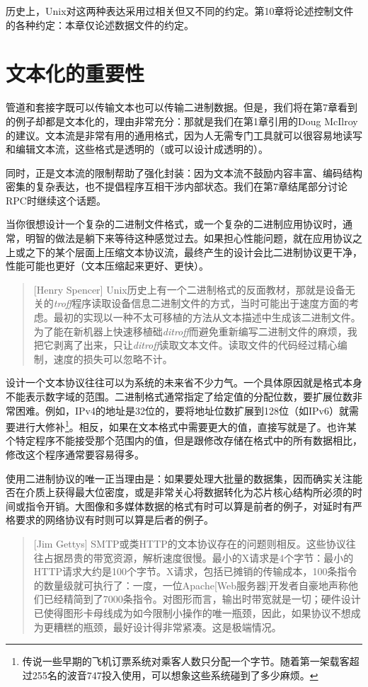 \documentclass[12pt,oneside]{book}
\begin{document}
历史上，Unix对这两种表达采用过相关但又不同的约定。第10章将论述控制文件的各种约定：本章仅论述数据文件的约定。

\section{文本化的重要性}
管道和套接字既可以传输文本也可以传输二进制数据。但是，我们将在第7章看到的例子却都是文本化的，理由非常充分：那就是我们在第1章引用的Doug McIlroy的建议。文本流是非常有用的通用格式，因为人无需专门工具就可以很容易地读写和编辑文本流，这些格式是透明的（或可以设计成透明的）。

同时，正是文本流的限制帮助了强化封装：因为文本流不鼓励内容丰富、编码结构密集的复杂表达，也不提倡程序互相干涉内部状态。我们在第7章结尾部分讨论RPC时继续这个话题。

当你很想设计一个复杂的二进制文件格式，或一个复杂的二进制应用协议时，通常，明智的做法是躺下来等待这种感觉过去。如果担心性能问题，就在应用协议之上或之下的某个层面上压缩文本协议流，最终产生的设计会比二进制协议更干净，性能可能也更好（文本压缩起来更好、更快）。

\begin{quote}[Henry Spencer]
Unix历史上有一个二进制格式的反面教材，那就是设备无关的\textit{troff}程序读取设备信息二进制文件的方式，当时可能出于速度方面的考虑。最初的实现以一种不太可移植的方法从文本描述中生成该二进制文件。为了能在新机器上快速移植础\textit{ditroff}而避免重新编写二进制文件的麻烦，我把它剥离了出来，只让\textit{ditroff}读取文本文件。读取文件的代码经过精心编制，速度的损失可以忽略不计。
\end{quote}

设计一个文本协议往往可以为系统的未来省不少力气。一个具体原因就是格式本身不能表示数字域的范围。二进制格式通常指定了给定值的分配位数，要扩展位数非常困难。例如，IPv4的地址是32位的，要将地址位数扩展到128位（如IPv6）就需要进行大修补\footnote{传说一些早期的飞机订票系统对乘客人数只分配一个字节。随着第一架载客超过255名的波音747投入使用，可以想象这些系统碰到了多少麻烦。}。相反，如果在文本格式中需要更大的值，直接写就是了。也许某个特定程序不能接受那个范围内的值，但是跟修改存储在格式中的所有数据相比，修改这个程序通常要容易得多。

使用二进制协议的唯一正当理由是：如果要处理大批量的数据集，因而确实关注能否在介质上获得最大位密度，或是非常关心将数据转化为芯片核心结构所必须的时间或指令开销。大图像和多媒体数据的格式有时可以算是前者的例子，对延时有严格要求的网络协议有时则可以算是后者的例子。

\begin{quote}[Jim Gettys]
SMTP或类HTTP的文本协议存在的问题则相反。这些协议往往占据昂贵的带宽资源，解析速度很慢。最小的X请求是4个字节：最小的HTTP请求大约是100个字节。X请求，包括已摊销的传输成本，100条指令的数量级就可执行了：一度，一位Apache[Web服务器]开发者自豪地声称他们已经精简到了7000条指令。对图形而言，输出时带宽就是一切；硬件设计已使得图形卡母线成为如今限制小操作的唯一瓶颈，因此，如果协议不想成为更糟糕的瓶颈，最好设计得非常紧凑。这是极端情况。
\end{quote}
\end{document}
